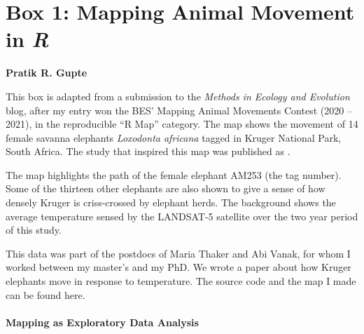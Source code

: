 
\pagestyle{plain}
\pagecolor{Snow2}

	\medskip
	\section*{Box 1: Mapping Animal Movement in \textit{R}}\label{box:mapping}

	\medskip

	\noindent \textbf{Pratik R. Gupte}

	\medskip

	\noindent {\large{$\Delta$}} {\small This box is adapted from a submission to the \textit{Methods in Ecology and Evolution} blog, after my entry won the BES' Mapping Animal Movements Contest (2020 -- 2021), in the reproducible ``R Map'' category. The map shows the movement of 14 female savanna elephants \textit{Loxodonta africana} tagged in Kruger National Park, South Africa.
	The study that inspired this map was published as \citet{thaker2019} .}

	\medskip

	The map highlights the path of the female elephant AM253 (the tag number). Some of the thirteen other elephants are also shown to give a sense of how densely Kruger is criss-crossed by elephant herds. The background shows the average temperature sensed by the LANDSAT-5 satellite over the two year period of this study.

	This data was part of the postdocs of Maria Thaker and Abi Vanak, for whom I worked between my master's and my PhD. We wrote a paper about how Kruger elephants move in response to temperature. The source code and the map I made can be found here.

	\paragraph*{Mapping as Exploratory Data Analysis}

